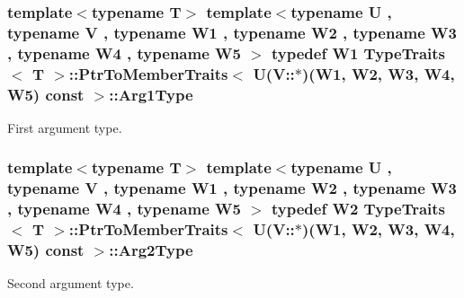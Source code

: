 \subsubsection[{\texorpdfstring{Arg1\+Type}{Arg1Type}}]{\setlength{\rightskip}{0pt plus 5cm}template$<$typename T$>$ template$<$typename U , typename V , typename W1 , typename W2 , typename W3 , typename W4 , typename W5 $>$ typedef W1 {\bf Type\+Traits}$<$ T $>$\+::{\bf Ptr\+To\+Member\+Traits}$<$ U(V\+::$\ast$)(W1, W2, W3, W4, W5) const  $>$\+::{\bf Arg1\+Type}}\hypertarget{structTypeTraits_1_1PtrToMemberTraits_3_01U_07V_1_1_5_08_07W1_00_01W2_00_01W3_00_01W4_00_01W5_08_01const_01_01_4_a71a4bd265aaa5993940204ececa6af4b}{}\label{structTypeTraits_1_1PtrToMemberTraits_3_01U_07V_1_1_5_08_07W1_00_01W2_00_01W3_00_01W4_00_01W5_08_01const_01_01_4_a71a4bd265aaa5993940204ececa6af4b}
First argument type. 
\subsubsection[{\texorpdfstring{Arg2\+Type}{Arg2Type}}]{\setlength{\rightskip}{0pt plus 5cm}template$<$typename T$>$ template$<$typename U , typename V , typename W1 , typename W2 , typename W3 , typename W4 , typename W5 $>$ typedef W2 {\bf Type\+Traits}$<$ T $>$\+::{\bf Ptr\+To\+Member\+Traits}$<$ U(V\+::$\ast$)(W1, W2, W3, W4, W5) const  $>$\+::{\bf Arg2\+Type}}\hypertarget{structTypeTraits_1_1PtrToMemberTraits_3_01U_07V_1_1_5_08_07W1_00_01W2_00_01W3_00_01W4_00_01W5_08_01const_01_01_4_aa632953479e4f4c3c1e1707d5b820228}{}\label{structTypeTraits_1_1PtrToMemberTraits_3_01U_07V_1_1_5_08_07W1_00_01W2_00_01W3_00_01W4_00_01W5_08_01const_01_01_4_aa632953479e4f4c3c1e1707d5b820228}
Second argument type. 
